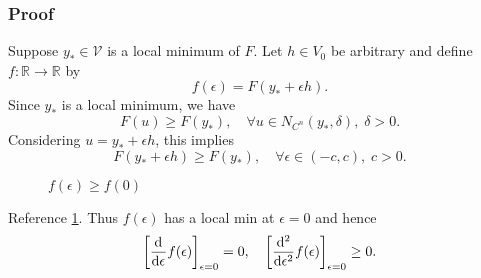 \documentclass[12pt,twoside]{article}
\begin{document}
\subsubsection{Proof}
Suppose $y_*\in\mathcal{V}$ is a local minimum of $F$. Let $h\in V_0$ be
arbitrary and define $f:\mathbb{R}\rightarrow\mathbb{R}$ by
$$f(\epsilon) = F(y_*+\epsilon h).$$
Since $y_*$ is a local minimum, we have
$$F(u)\ge F(y_*),\quad \forall u\in N_{C^n}(y_*,\delta),\;\delta>0.$$
Considering $u=y_*+\epsilon h$, this implies
$$F(y_*+\epsilon h)\ge F(y_*),\quad \forall \epsilon\in(-c,c),\; c>0.$$

\begin{figure}[ht]
  \centering
  \caption{$f(\epsilon)\ge f(0)$}
  \label{fig:fepsilon-le-fzero}
\end{figure}

Reference \cref{fig:fepsilon-le-fzero}. Thus $f(\epsilon)$ has a local min at
$\epsilon=0$ and hence
\begin{equation*}
  \left[ \od{}{\epsilon}f(\epsilon) \right]_{\epsilon=0}=0,\quad
  \left[ \od[2]{}{\epsilon} f(\epsilon) \right]_{\epsilon=0}\ge0.
\end{equation*}
\end{document}
